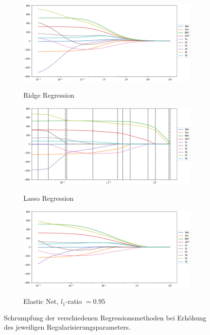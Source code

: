 \begin{figure}
\centering
	\begin{subfigure}{0.9\textwidth}
	\centering
	\includegraphics[width = \textwidth]{figures/ridge_regression_coefficients.png}
	\label{ridge_regression_coefficients}
	\vspace{-0.5cm}
	\caption{Ridge Regression}
	\vspace{0.5cm}
	\end{subfigure}
	\begin{subfigure}{0.9\textwidth}
	\centering
	\includegraphics[width = \textwidth]{figures/lasso_regression_coefficients.png}
	\label{lasso_regression_coefficients}
	\vspace{-0.5cm}
	\caption{Lasso Regression}
	\vspace{0.5cm}
	\end{subfigure}
	\begin{subfigure}{0.9\textwidth}
	\centering
	\includegraphics[width = \textwidth]{figures/elastic_net_coefficients.png}
	\label{elastic_net_coefficients}
	\vspace{-0.5cm}
	\caption{Elastic Net, $l_1$-ratio $= 0.95$}
	\end{subfigure}
\caption{Schrumpfung der verschiedenen Regressionsmethoden bei Erhöhung des jeweiligen Regularisierungsparameters.}
\label{regression_coefficients}
\end{figure}

